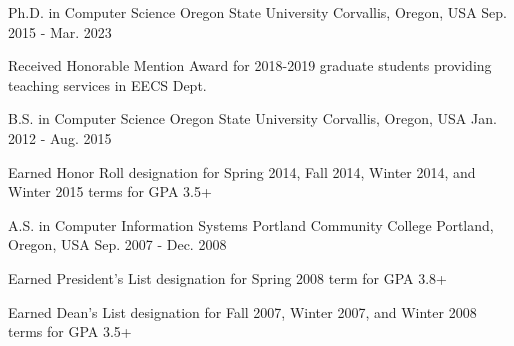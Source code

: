 

\begin{cventries}

  \cventry
    {Ph.D. in Computer Science} %
    {Oregon State University} %
    {Corvallis, Oregon, USA} %
    {Sep. 2015 - Mar. 2023} %
    {
      \begin{cvitems} %
        \item {Received Honorable Mention Award for 2018-2019 graduate students providing teaching services in EECS Dept.}
      \end{cvitems}
    }

  \cventry
    {B.S. in Computer Science} %
    {Oregon State University} %
    {Corvallis, Oregon, USA} %
    {Jan. 2012 - Aug. 2015} %
    {
      \begin{cvitems} %
        \item {Earned Honor Roll designation for Spring 2014, Fall 2014, Winter 2014, and Winter 2015 terms for GPA 3.5+}
      \end{cvitems}
    }

  \cventry
    {A.S. in Computer Information Systems} %
    {Portland Community College} %
    {Portland, Oregon, USA} %
    {Sep. 2007 - Dec. 2008} %
    {
      \begin{cvitems} %
        \item {Earned President's List designation for Spring 2008 term for GPA 3.8+}
        \item {Earned Dean's List designation for Fall 2007, Winter 2007, and Winter 2008 terms for GPA 3.5+}
      \end{cvitems}
    }
    
\end{cventries}
